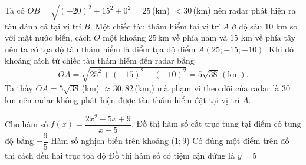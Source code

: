 \begin{ex}
{\begin{itemchoice}
			\itemch
			Ta có $OB=\sqrt{(-20)^{2}+15^{2}+0^{2}}=25$\,(km) $<30$\,(km) nên radar phát hiện ra tàu đánh cá tại vị trí $B$.
			\itemch
			Một chiếc tàu thám hiểm tại vị trí $A$ ở độ sâu $10$ km so với mặt nước biển, cách $O$ một khoảng $25$\,km về phía nam và $15$ km về phía tây nên ta có tọa độ tàu thám hiểm là điểm tọa độ điểm $A(25;-15;-10)$. Khi đó khoảng cách từ chiếc tàu thám hiểm đến radar bằng $$OA=\sqrt{25^{2}+(-15)^{2}+(-10)^{2}}=5\sqrt{38}\,(\mathrm{km}).$$
			\itemch
			Ta thấy $OA=5\sqrt{38}$\,(km) $\approx 30{,}82$\,(km,) mà phạm vi theo dõi của radar là $30$\,km nên radar không phát hiện được tàu thám hiểm đặt tại vị trí $A$.
			
	\end{itemchoice}}
\end{ex}
\begin{ex}%
	Cho hàm số $f(x)=\dfrac{2x^{2}-5x+9}{x-5}$.
	\choiceTF
	{\True Đồ thị hàm số cắt trục tung tại điểm có tung độ bằng $-\dfrac{9}{5}$}
	{Hàm số nghịch biến trên khoảng ($1;9$)}
	{Có đúng một điểm trên đồ thị cách đều hai trục tọa độ}
	{Đồ thị hàm số có tiệm cận đứng là $y=5$}
\end{ex}
